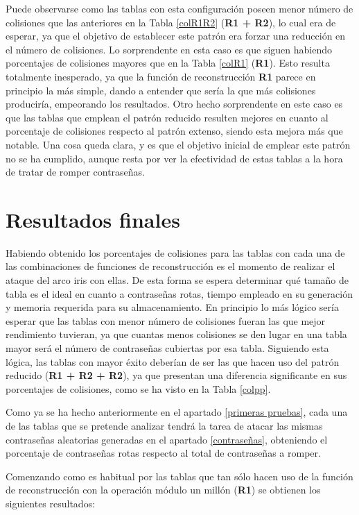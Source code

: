 \documentclass[12pt,spanish,listoffigures,listoftables,listofalgorithms]{tfgetsinf}
\begin{document}
Puede observarse como las tablas con esta configuración poseen menor número de colisiones que las anteriores en la Tabla \ref{colR1R2} (\textbf{R1 + R2}), lo cual era de esperar, ya que el objetivo de establecer este patrón era forzar una reducción en el número de colisiones. Lo sorprendente en esta caso es que siguen habiendo porcentajes de colisiones mayores que en la Tabla \ref{colR1} (\textbf{R1}). Esto resulta totalmente inesperado, ya que la función de reconstrucción \textbf{R1} parece en principio la más simple, dando a entender que sería la que más colisiones produciría, empeorando los resultados. Otro hecho sorprendente en este caso es que las tablas que emplean el patrón reducido resulten mejores en cuanto al porcentaje de colisiones respecto al patrón extenso, siendo esta mejora más que notable. Una cosa queda clara, y es que el objetivo inicial de emplear este patrón no se ha cumplido, aunque resta por ver la efectividad de estas tablas a la hora de tratar de romper contraseñas.

\section{Resultados finales}

Habiendo obtenido los porcentajes de colisiones para las tablas con cada una de las combinaciones de funciones de reconstrucción es el momento de realizar el ataque del arco iris con ellas. De esta forma se espera determinar qué tamaño de tabla es el ideal en cuanto a contraseñas rotas, tiempo empleado en su generación y memoria requerida para su almacenamiento. En principio lo más lógico sería esperar que las tablas con menor número de colisiones fueran las que mejor rendimiento tuvieran, ya que cuantas menos colisiones se den lugar en una tabla mayor será el número de contraseñas cubiertas por esa tabla. Siguiendo esta lógica, las tablas con mayor éxito deberían de ser las que hacen uso del patrón reducido (\textbf{R1 + R2 + R2}), ya que presentan una diferencia significante en sus porcentajes de colisiones, como se ha visto en la Tabla \ref{colpp}.

Como ya se ha hecho anteriormente en el apartado \ref{primeras pruebas}, cada una de las tablas que se pretende analizar tendrá la tarea de atacar las mismas contraseñas aleatorias generadas en el apartado \ref{contraseñas}, obteniendo el porcentaje de contraseñas rotas respecto al total de contraseñas a romper.

Comenzando como es habitual por las tablas que tan sólo hacen uso de la función de reconstrucción con la operación módulo un millón (\textbf{R1}) se obtienen los siguientes resultados:
\end{document}
